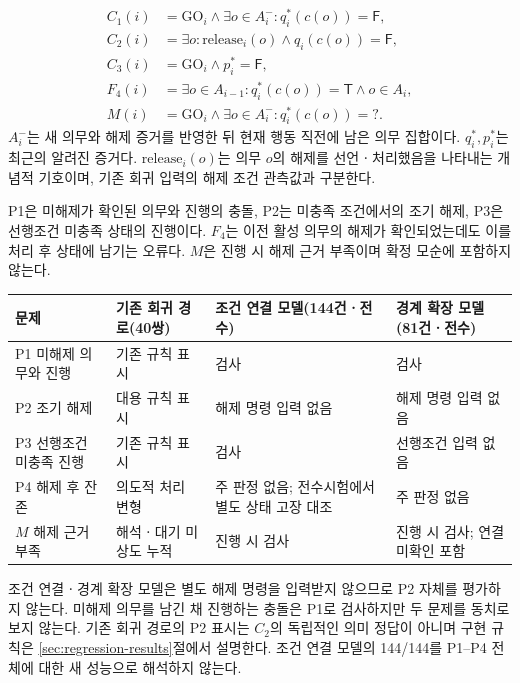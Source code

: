 \begin{revision}
\begin{align}
C_1(i)&=\mathrm{GO}_i\land\exists o\in A_i^-:q_i^*(c(o))=\mathsf{F},\label{eq:hold-conflict}\\
C_2(i)&=\exists o:\mathrm{release}_i(o)\land q_i(c(o))=\mathsf{F},\\
C_3(i)&=\mathrm{GO}_i\land p_i^*=\mathsf{F},\\
F_4(i)&=\exists o\in A_{i-1}:q_i^*(c(o))=\mathsf{T}\land o\in A_i,\\
M(i)&=\mathrm{GO}_i\land\exists o\in A_i^-:q_i^*(c(o))=? .\label{eq:missing-evidence}
\end{align}
$A_i^-$는 새 의무와 해제 증거를 반영한 뒤 현재 행동 직전에 남은 의무 집합이다. $q_i^*,p_i^*$는 최근의 알려진 증거다. $\mathrm{release}_i(o)$는 의무 $o$의 해제를 선언ㆍ처리했음을 나타내는 개념적 기호이며, 기존 회귀 입력의 해제 조건 관측값과 구분한다.

P1은 미해제가 확인된 의무와 진행의 충돌, P2는 미충족 조건에서의 조기 해제, P3은 선행조건 미충족 상태의 진행이다. $F_4$는 이전 활성 의무의 해제가 확인되었는데도 이를 처리 후 상태에 남기는 오류다. $M$은 진행 시 해제 근거 부족이며 확정 모순에 포함하지 않는다.

\begin{table}[t]
\centering
\color{revisionblue}
\label{tab:model-scope}
\footnotesize
\begin{tabularx}{\textwidth}{L{.23\textwidth}L{.22\textwidth}L{.25\textwidth}Y}
\toprule
문제 & 기존 회귀 경로(40쌍) & 조건 연결 모델(144건ㆍ전수) & 경계 확장 모델(81건ㆍ전수) \\
\midrule
P1 미해제 의무와 진행 & 기존 규칙 표시 & 검사 & 검사 \\
P2 조기 해제 & 대용 규칙 표시 & 해제 명령 입력 없음 & 해제 명령 입력 없음 \\
P3 선행조건 미충족 진행 & 기존 규칙 표시 & 검사 & 선행조건 입력 없음 \\
P4 해제 후 잔존 & 의도적 처리 변형 & 주 판정 없음; 전수시험에서 별도 상태 고장 대조 & 주 판정 없음 \\
$M$ 해제 근거 부족 & 해석ㆍ대기 미상도 누적 & 진행 시 검사 & 진행 시 검사; 연결 미확인 포함 \\
\bottomrule
\end{tabularx}
\end{table}

조건 연결ㆍ경계 확장 모델은 별도 해제 명령을 입력받지 않으므로 P2 자체를 평가하지 않는다. 미해제 의무를 남긴 채 진행하는 충돌은 P1로 검사하지만 두 문제를 동치로 보지 않는다. 기존 회귀 경로의 P2 표시는 $C_2$의 독립적인 의미 정답이 아니며 구현 규칙은 \ref{sec:regression-results}절에서 설명한다. 조건 연결 모델의 144/144를 P1--P4 전체에 대한 새 성능으로 해석하지 않는다.


\end{revision}

